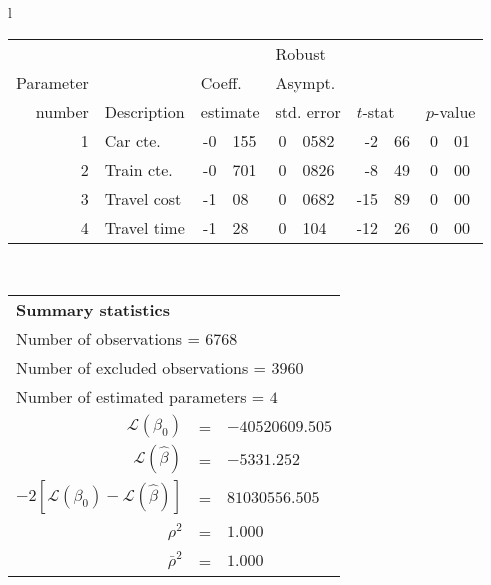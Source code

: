   \begin{tabular}{l}
\begin{tabular}{rlr@{.}lr@{.}lr@{.}lr@{.}l}
         &                       &   \multicolumn{2}{l}{}    & \multicolumn{2}{l}{Robust}  &     \multicolumn{4}{l}{}   \\
Parameter &                       &   \multicolumn{2}{l}{Coeff.}      & \multicolumn{2}{l}{Asympt.}  &     \multicolumn{4}{l}{}   \\
number &  Description                     &   \multicolumn{2}{l}{estimate}      & \multicolumn{2}{l}{std. error}  &   \multicolumn{2}{l}{$t$-stat}  &   \multicolumn{2}{l}{$p$-value}   \\

\hline

1 & Car cte. & -0&155 & 0&0582 & -2&66 & 0&01\\
2 & Train cte. & -0&701 & 0&0826 & -8&49 & 0&00\\
3 & Travel cost & -1&08 & 0&0682 & -15&89 & 0&00\\
4 & Travel time & -1&28 & 0&104 & -12&26 & 0&00\\
\hline
\end{tabular}
\\
\begin{tabular}{rcl}
\multicolumn{3}{l}{\bf Summary statistics}\\
\multicolumn{3}{l}{ Number of observations = $6768$} \\
\multicolumn{3}{l}{ Number of excluded observations = $3960$} \\
\multicolumn{3}{l}{ Number of estimated  parameters = $4$} \\
 $\mathcal{L}(\beta_0)$ &=&  $-40520609.505$ \\
 $\mathcal{L}(\hat{\beta})$ &=& $-5331.252 $  \\
 $-2[\mathcal{L}(\beta_0) -\mathcal{L}(\hat{\beta})]$ &=& $81030556.505$ \\
    $\rho^2$ &=&   $1.000$ \\
    $\bar{\rho}^2$ &=&    $1.000$ \\
\end{tabular}
  \end{tabular}
